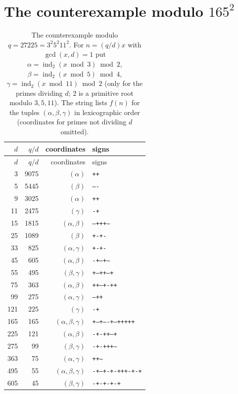 \documentclass[11pt]{amsart}
\theoremstyle{definition}
\theoremstyle{remark}
\numberwithin{equation}{section}
\begin{document}
\section{\texorpdfstring{The counterexample modulo $165^2$}{The counterexample modulo 165^2}}\label{app:27225}
\begin{longtable}{rrrl}
\caption{The counterexample modulo $q=27225=3^2 5^2 11^2$. For $n=(q/d)x$ with $\gcd(x,d)=1$ put $\alpha=\operatorname{ind}_2(x\bmod 3)\bmod 2$, $\beta=\operatorname{ind}_2(x\bmod 5)\bmod 4$, $\gamma=\operatorname{ind}_2(x\bmod 11)\bmod 2$ (only for the primes dividing $d$; $2$ is a primitive root modulo $3,5,11$). The string lists $f(n)$ for the tuples $(\alpha,\beta,\gamma)$ in lexicographic order (coordinates for primes not dividing $d$ omitted).}\label{tab:27225}\\
\toprule $d$ & $q/d$ & coordinates & signs\\ \midrule\endfirsthead
\toprule $d$ & $q/d$ & coordinates & signs\\ \midrule\endhead
3 & 9075 & $(\alpha)$ & \texttt{++}\\
5 & 5445 & $(\beta)$ & \texttt{----}\\
9 & 3025 & $(\alpha)$ & \texttt{++}\\
11 & 2475 & $(\gamma)$ & \texttt{-+}\\
15 & 1815 & $(\alpha,\beta)$ & \texttt{--+++---}\\
25 & 1089 & $(\beta)$ & \texttt{+-+-}\\
33 & 825 & $(\alpha,\gamma)$ & \texttt{+-+-}\\
45 & 605 & $(\alpha,\beta)$ & \texttt{-+---+--}\\
55 & 495 & $(\beta,\gamma)$ & \texttt{+--++--+}\\
75 & 363 & $(\alpha,\beta)$ & \texttt{++--+-++}\\
99 & 275 & $(\alpha,\gamma)$ & \texttt{--++}\\
121 & 225 & $(\gamma)$ & \texttt{-+}\\
165 & 165 & $(\alpha,\beta,\gamma)$ & \texttt{+--+----+--+++++}\\
225 & 121 & $(\alpha,\beta)$ & \texttt{-+-++--+}\\
275 & 99 & $(\beta,\gamma)$ & \texttt{-+-+++--}\\
363 & 75 & $(\alpha,\gamma)$ & \texttt{++--}\\
495 & 55 & $(\alpha,\beta,\gamma)$ & \texttt{-+---+-+-+++-+-+}\\
605 & 45 & $(\beta,\gamma)$ & \texttt{-+-+-+-+}\\

\end{longtable}
\end{document}

